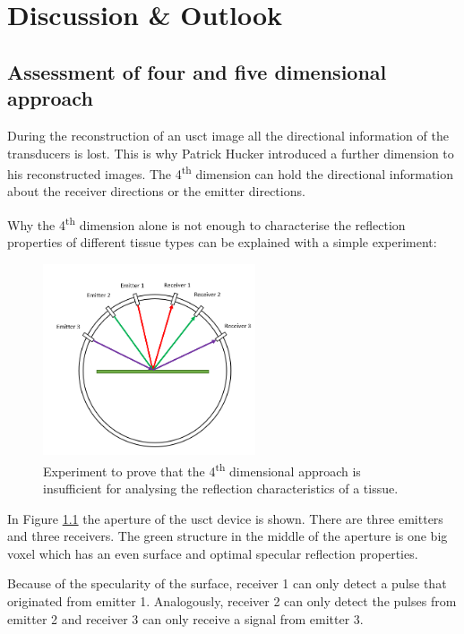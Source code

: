 \chapter{Discussion \& Outlook}
\label{chap:discussion}


\section{Assessment of four and five dimensional approach}

During the reconstruction of an \ac{usct} image all the directional information of the transducers is lost. This is why Patrick Hucker \cite{PatrickHucker2014EvaluationRuckstreumodells} introduced a further dimension to his reconstructed images. The 4\textsuperscript{th} dimension can hold the directional information about the receiver directions or the emitter directions.

Why the 4\textsuperscript{th} dimension alone is not enough to characterise the reflection properties of different tissue types can be explained with a simple experiment:


\begin{figure}[H]
    \centering
    \includegraphics[width=0.56\textwidth]{Graphics/Diskussion/4D_not_enough.png}
    \caption{Experiment to prove that the 4\textsuperscript{th} dimensional approach is insufficient for analysing the reflection characteristics of a tissue. }
    \label{4D_sucks}
\end{figure}

In Figure \ref{4D_sucks} the aperture of the \ac{usct} device is shown. There are three emitters and three receivers. The green structure in the middle of the aperture is one big voxel which has an even surface and optimal specular reflection properties.

Because of the specularity of the surface, receiver 1 can only detect a pulse that originated from emitter 1. Analogously, receiver 2 can only detect the pulses from emitter 2 and receiver 3 can only receive a signal from emitter 3.

